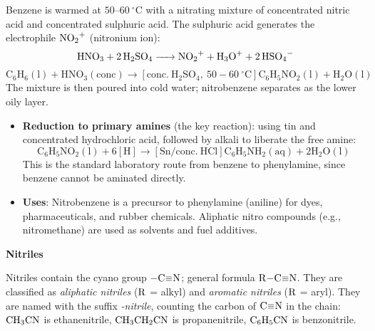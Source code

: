 \documentclass[11pt]{article}
\newcommand{\cle}[1]{{\popxbold\color{popdark}#1}}
\begin{document}
\begin{experience}
Benzene is warmed at $50$--$\SI{60}{\ensuremath{{}^{\circ}\mathrm{C}}}$ with a nitrating mixture of concentrated nitric acid and concentrated sulphuric acid. The sulphuric acid generates the electrophile $\ce{NO2+}$ (nitronium ion):
\[ \ce{HNO3 + 2H2SO4 -> NO2+ + H3O+ + 2HSO4-} \]
\[ \ensuremath{\mathrm{C_{6}H_{6}(l) + HNO_{3}(conc) \rightarrow [conc.\ H_{2}SO_{4},\ 50-60\ ^{\circ}C] C_{6}H_{5}NO_{2}(l) + H_{2}O(l)}} \]
The mixture is then poured into cold water; nitrobenzene separates as the lower oily layer.
\end{experience}

\begin{propriete}
\begin{itemize}
\item \textbf{Reduction to primary amines} (the key reaction): using tin and concentrated hydrochloric acid, followed by alkali to liberate the free amine:
\[ \ensuremath{\mathrm{C_{6}H_{5}NO_{2}(l) + 6[H] \rightarrow [Sn/conc.\ HCl] C_{6}H_{5}NH_{2}(aq) + 2H_{2}O(l)}} \]
This is the standard laboratory route from benzene to phenylamine, since benzene cannot be aminated directly.
\item \textbf{Uses}: Nitrobenzene is a precursor to phenylamine (aniline) for dyes, pharmaceuticals, and rubber chemicals. Aliphatic nitro compounds (e.g., nitromethane) are used as solvents and fuel additives.
\end{itemize}
\end{propriete}

\textbf{Nitriles}\par

\cle{Nitriles} contain the cyano group $\ce{-C#N}$; general formula $\ce{R-C#N}$. They are classified as \emph{aliphatic nitriles} ($\ce{R}$ = alkyl) and \emph{aromatic nitriles} ($\ce{R}$ = aryl). They are named with the suffix \emph{-nitrile}, counting the carbon of $\ce{C#N}$ in the chain: $\ce{CH3CN}$ is ethanenitrile, $\ce{CH3CH2CN}$ is propanenitrile, $\ce{C6H5CN}$ is benzonitrile.
\end{document}

